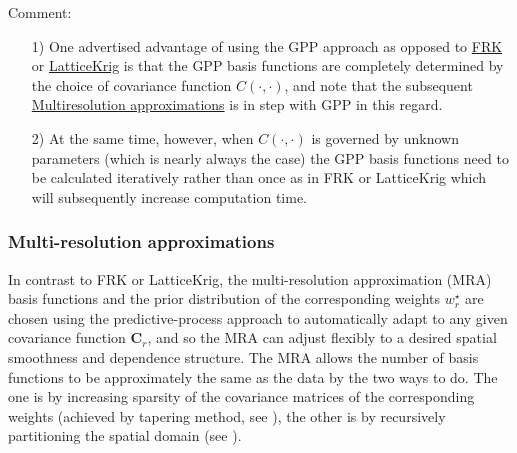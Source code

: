 \documentclass[
12pt, %
a4paper, %
oneside, %
headinclude,footinclude, %
BCOR5mm, %
]{scrartcl}
\begin{document}
\textcolor[rgb]{1.00,0.00,1.00}{Comment:}
\begin{itemize}
 \item [1)]One advertised advantage of using the GPP approach as opposed to \href{https://chenyw68.github.io/Literature/[2017]FRK_intro.pdf}{FRK} or \href{https://chenyw68.github.io/Literature/[2014]LatticeKrig A multi-resolution spatial model for large data.pdf}{LatticeKrig} is that the GPP basis functions are completely determined by the choice of covariance function $C(\cdot, \cdot)$, and note that the subsequent \href{https://chenyw68.github.io/Literature/[2017]A Multi-Resolution Approximation for Massive Spatial Datasets.pdf}{Multiresolution approximations} is in step with GPP in this regard.
\item [2)]At the same time, however, when $C(\cdot, \cdot)$ is governed by unknown parameters (which is nearly always the case) the GPP basis functions need to be calculated iteratively rather than once as in FRK or LatticeKrig which will subsequently increase computation time.
\end{itemize}

\subsubsection{Multi-resolution approximations}
In contrast to FRK or LatticeKrig, the multi-resolution approximation (MRA) basis functions and the prior distribution of the corresponding weights $w_r^{\star}$ are chosen using the predictive-process approach to automatically adapt to any given covariance function $\boldsymbol{C}_r$, and so the MRA can adjust flexibly to a desired spatial smoothness and dependence structure. The MRA allows the number of basis functions to be approximately the same as the data by the two ways to do. The one is by increasing sparsity of the covariance matrices of the corresponding weights (achieved by tapering method, see  \href{https://chenyw68.github.io/Literature/[2017-formal]Parallel inference for massive distributed spatial data using low-rank models.pdf
}{\citep{katzfuss2017parallel}}), the other is by recursively partitioning the spatial domain (see \href{https://chenyw68.github.io/Literature/[2017]A Multi-Resolution Approximation for Massive Spatial Datasets.pdf}{\citep{katzfuss2017multi}}).


\end{document}
